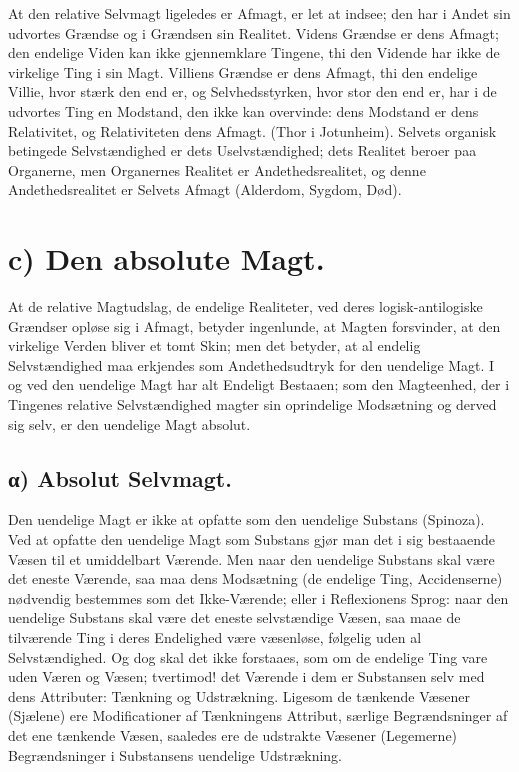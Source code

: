\documentclass[12pt]{book}
\newcommand{\opage}[1]{\marginnote{\footnotesize\textit{[#1]}}}
\begin{document}
At den relative Selvmagt ligeledes er Afmagt, er let at
indsee; den har i Andet sin udvortes Grændse og i
Grændsen sin Realitet. Videns Grændse er dens Afmagt; den
endelige Viden kan ikke gjennemklare Tingene, thi den
Vidende har ikke de virkelige Ting i sin Magt. Villiens
Grændse er dens Afmagt, thi den endelige Villie, hvor stærk
den end er, og Selvhedsstyrken, hvor stor den end er, har
i de udvortes Ting en Modstand, den ikke kan overvinde:
dens Modstand er dens Relativitet, og Relativiteten dens
Afmagt. (Thor i Jotunheim). Selvets organisk betingede
Selvstændighed er dets Uselvstændighed; dets Realitet beroer
paa Organerne, men Organernes Realitet er Andethedsrealitet,
og denne Andethedsrealitet er Selvets Afmagt (Alderdom,
Sygdom, Død).

\section*{c) Den absolute Magt.}

At de relative Magtudslag, de endelige Realiteter, ved
deres logisk-antilogiske Grændser opløse sig i Afmagt,
betyder ingenlunde, at Magten forsvinder, at den virkelige
Verden bliver et tomt Skin; men det betyder, at al endelig
Selvstændighed maa erkjendes som Andethedsudtryk for den
uendelige Magt. I og ved den uendelige Magt har alt
Endeligt Bestaaen; som den Magteenhed, der i Tingenes
relative Selvstændighed magter sin oprindelige Modsætning
og derved sig selv, er den uendelige Magt absolut.

\subsection*{α) Absolut Selvmagt.}

Den uendelige Magt er
ikke at opfatte som den uendelige Substans (Spinoza). Ved
\opage{38} at opfatte den uendelige Magt som Substans gjør man det
i sig bestaaende Væsen til et umiddelbart Værende. Men
naar den uendelige Substans skal være det eneste Værende,
saa maa dens Modsætning (de endelige Ting, Accidenserne)
nødvendig bestemmes som det Ikke-Værende; eller i
Reflexionens Sprog: naar den uendelige Substans skal være det
eneste selvstændige Væsen, saa maae de tilværende Ting i
deres Endelighed være væsenløse, følgelig uden al
Selvstændighed. Og dog skal det ikke forstaaes, som om de endelige
Ting vare uden Væren og Væsen; tvertimod! det Værende
i dem er Substansen selv med dens Attributer: Tænkning og
Udstrækning. Ligesom de tænkende Væsener (Sjælene) ere
Modificationer af Tænkningens Attribut, særlige
Begrændsninger af det ene tænkende Væsen, saaledes ere de udstrakte
Væsener (Legemerne) Begrændsninger i Substansens
uendelige Udstrækning.
\end{document}
